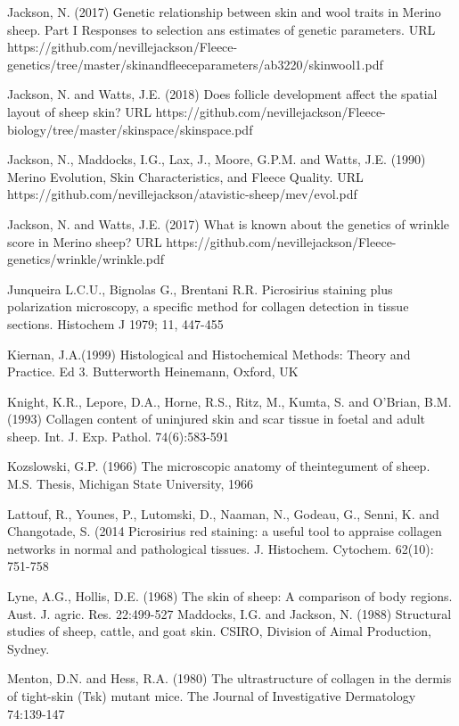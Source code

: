 \documentclass[titlepage]{article}  %
\begin{document}
\begin{thebibliography}{99}
Jackson, N. (2017) Genetic relationship between skin and wool traits in Merino sheep. Part I Responses to selection ans estimates of genetic parameters. URL https://github.com/nevillejackson/Fleece-genetics/tree/master/skinandfleeceparameters/ab3220/skinwool1.pdf

Jackson, N. and Watts, J.E. (2018) Does follicle development affect the spatial layout of sheep skin? URL https://github.com/nevillejackson/Fleece-biology/tree/master/skinspace/skinspace.pdf

Jackson, N., Maddocks, I.G., Lax, J., Moore, G.P.M. and Watts, J.E. (1990) Merino Evolution, Skin Characteristics, and Fleece Quality. URL https://github.com/nevillejackson/atavistic-sheep/mev/evol.pdf 

Jackson, N. and Watts, J.E. (2017) What is known about the genetics of wrinkle score in Merino sheep? URL https://github.com/nevillejackson/Fleece-genetics/wrinkle/wrinkle.pdf

Junqueira L.C.U., Bignolas G., Brentani R.R. Picrosirius staining plus polarization microscopy, a specific method for collagen detection in tissue sections. Histochem J 1979; 11, 447-455

Kiernan, J.A.(1999) Histological and Histochemical Methods: Theory and Practice. Ed 3. Butterworth Heinemann, Oxford, UK

Knight, K.R., Lepore, D.A., Horne, R.S., Ritz, M., Kumta, S. and O'Brian, B.M. (1993) Collagen content of uninjured skin and scar tissue in foetal and adult sheep. Int. J. Exp. Pathol. 74(6):583-591

Kozslowski, G.P. (1966) The microscopic anatomy of theintegument of sheep. M.S. Thesis, Michigan State University, 1966

Lattouf, R., Younes, P., Lutomski, D., Naaman, N., Godeau, G., Senni, K. and Changotade, S. (2014  Picrosirius red staining: a useful tool to appraise collagen networks in normal and pathological tissues. J. Histochem. Cytochem. 62(10): 751-758

Lyne, A.G., Hollis, D.E. (1968) The skin of sheep: A comparison of body regions. Aust. J. agric. Res. 22:499-527
Maddocks, I.G. and Jackson, N. (1988) Structural studies of sheep, cattle, and goat skin. CSIRO, Division of Aimal Production, Sydney.

Menton, D.N. and Hess, R.A. (1980) The ultrastructure of collagen in the dermis of tight-skin (Tsk) mutant mice. The Journal of Investigative Dermatology 74:139-147


\end{thebibliography}
\end{document}
